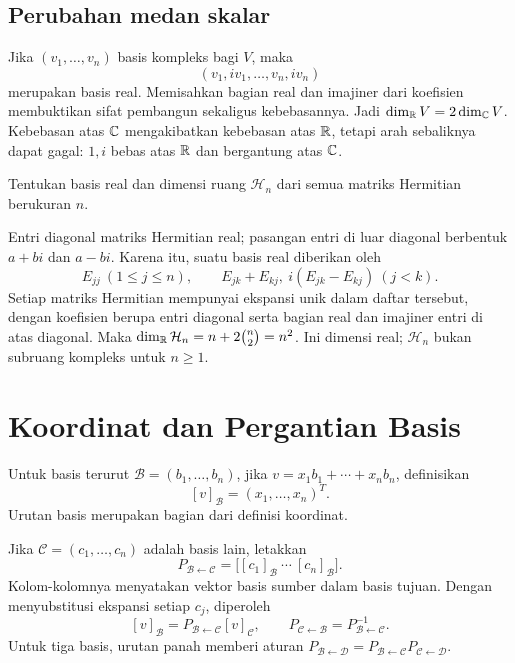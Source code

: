 \subsection{Perubahan medan skalar}
Jika $(v_1,\ldots,v_n)$ basis kompleks bagi $V$, maka
\[
    (v_1,iv_1,\ldots,v_n,iv_n)
\]
merupakan basis real. Memisahkan bagian real dan imajiner dari
koefisien membuktikan sifat pembangun sekaligus kebebasannya.
Jadi $\dim_{\mathbb{R}}V=2\dim_{\mathbb{C}}V$.
Kebebasan atas $\mathbb{C}$ mengakibatkan kebebasan atas $\mathbb{R}$, tetapi
arah sebaliknya dapat gagal: $1,i$ bebas atas $\mathbb{R}$ dan bergantung atas $\mathbb{C}$.

\begin{exam}
    Tentukan basis real dan dimensi ruang $\mathcal H_n$
    dari semua matriks Hermitian berukuran $n$.
\end{exam}
\begin{solution}
    Entri diagonal matriks Hermitian real; pasangan entri
    di luar diagonal berbentuk $a+bi$ dan $a-bi$.
    Karena itu, suatu basis real diberikan oleh
    \[
        E_{jj}\ (1\le j\le n),\qquad
        E_{jk}+E_{kj},\ i(E_{jk}-E_{kj})\ (j<k).
    \]
    Setiap matriks Hermitian mempunyai ekspansi unik dalam daftar
    tersebut, dengan koefisien berupa entri diagonal serta bagian
    real dan imajiner entri di atas diagonal. Maka
    $\dim_{\mathbb{R}}\mathcal H_n=n+2\binom n2=n^2$.
    Ini dimensi real; $\mathcal H_n$ bukan subruang kompleks untuk $n\ge1$.
\end{solution}

\section{Koordinat dan Pergantian Basis}

\begin{definisi}
    Untuk basis terurut $\mathcal B=(b_1,\ldots,b_n)$, jika
    $v=x_1b_1+\cdots+x_nb_n$, definisikan
    \[
        [v]_{\mathcal B}=(x_1,\ldots,x_n)^T.
    \]
    Urutan basis merupakan bagian dari definisi koordinat.
\end{definisi}

Jika $\mathcal C=(c_1,\ldots,c_n)$ adalah basis lain, letakkan
\[
    P_{\mathcal B\leftarrow\mathcal C}
      =\bigl[[c_1]_{\mathcal B}\ \cdots\ [c_n]_{\mathcal B}\bigr].
\]
Kolom-kolomnya menyatakan vektor basis sumber dalam basis tujuan.
Dengan menyubstitusi ekspansi setiap $c_j$, diperoleh
\[
    [v]_{\mathcal B}
      =P_{\mathcal B\leftarrow\mathcal C}[v]_{\mathcal C},
    \qquad
    P_{\mathcal C\leftarrow\mathcal B}
      =P_{\mathcal B\leftarrow\mathcal C}^{-1}.
\]
Untuk tiga basis, urutan panah memberi aturan
$P_{\mathcal B\leftarrow\mathcal D}
=P_{\mathcal B\leftarrow\mathcal C}P_{\mathcal C\leftarrow\mathcal D}$.

